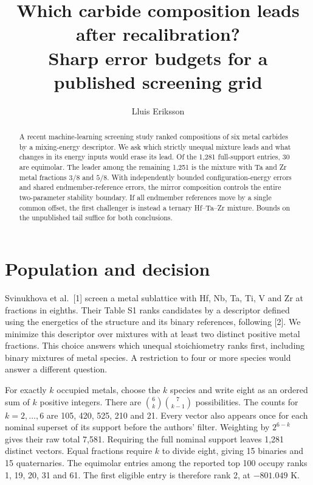 \documentclass[11pt]{article}
\title{Which carbide composition leads after recalibration?\\Sharp error budgets for a published screening grid}
\author{Lluis Eriksson}
\date{}
\begin{document}
\maketitle
\begin{abstract}
A recent machine-learning screening study ranked compositions of six metal carbides by a mixing-energy descriptor. We ask which strictly unequal mixture leads and what changes in its energy inputs would erase its lead. Of the 1,281 full-support entries, 30 are equimolar. The leader among the remaining 1,251 is the mixture with Ta and Zr metal fractions $3/8$ and $5/8$. With independently bounded configuration-energy errors and shared endmember-reference errors, the mirror composition controls the entire two-parameter stability boundary. If all endmember references move by a single common offset, the first challenger is instead a ternary Hf--Ta--Zr mixture. Bounds on the unpublished tail suffice for both conclusions.
\end{abstract}
\section{Population and decision}
Svinukhova et al.\ [1] screen a metal sublattice with Hf, Nb, Ta, Ti, V and Zr at fractions in eighths. Their Table S1 ranks candidates by a descriptor defined using the energetics of the structure and its binary references, following [2]. We minimize this descriptor over mixtures with at least two distinct positive metal fractions. This choice answers which unequal stoichiometry ranks first, including binary mixtures of metal species. A restriction to four or more species would answer a different question.

For exactly $k$ occupied metals, choose the $k$ species and write eight as an ordered sum of $k$ positive integers. There are $\binom6k\binom7{k-1}$ possibilities. The counts for $k=2,\ldots,6$ are 105, 420, 525, 210 and 21. Every vector also appears once for each nominal superset of its support before the authors' filter. Weighting by $2^{6-k}$ gives their raw total 7,581. Requiring the full nominal support leaves 1,281 distinct vectors. Equal fractions require $k$ to divide eight, giving 15 binaries and 15 quaternaries. The equimolar entries among the reported top 100 occupy ranks 1, 19, 20, 31 and 61. The first eligible entry is therefore rank 2, at $-801.049$ K.
\end{document}
